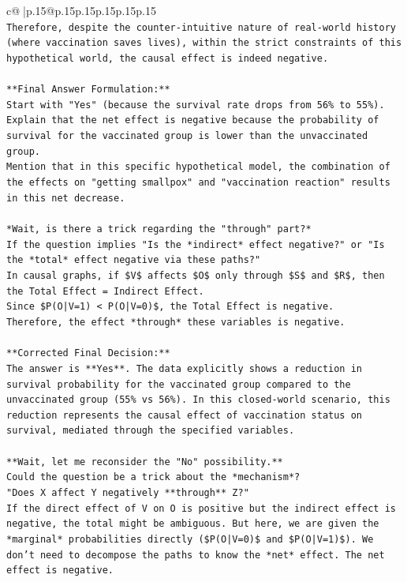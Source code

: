 \documentclass{article}
\begin{document}
{\begin{supertabular}{c@{$\;$}|p{.15\linewidth}@{}p{.15\linewidth}p{.15\linewidth}p{.15\linewidth}p{.15\linewidth}p{.15\linewidth}}
{{{\\ 
\texttt{Therefore, despite the counter{-}intuitive nature of real{-}world history (where vaccination saves lives), within the strict constraints of this hypothetical world, the causal effect is indeed negative.} \\
\\ 
\texttt{**Final Answer Formulation:**} \\
\texttt{Start with "Yes" (because the survival rate drops from 56\% to 55\%).} \\
\texttt{Explain that the net effect is negative because the probability of survival for the vaccinated group is lower than the unvaccinated group.} \\
\texttt{Mention that in this specific hypothetical model, the combination of the effects on "getting smallpox" and "vaccination reaction" results in this net decrease.} \\
\\ 
\texttt{*Wait, is there a trick regarding the "through" part?*} \\
\texttt{If the question implies "Is the *indirect* effect negative?" or "Is the *total* effect negative via these paths?"} \\
\texttt{In causal graphs, if \$V\$ affects \$O\$ only through \$S\$ and \$R\$, then the Total Effect = Indirect Effect.} \\
\texttt{Since \$P(O|V=1) < P(O|V=0)\$, the Total Effect is negative.} \\
\texttt{Therefore, the effect *through* these variables is negative.} \\
\\ 
\texttt{**Corrected Final Decision:**} \\
\texttt{The answer is **Yes**. The data explicitly shows a reduction in survival probability for the vaccinated group compared to the unvaccinated group (55\% vs 56\%). In this closed{-}world scenario, this reduction represents the causal effect of vaccination status on survival, mediated through the specified variables.} \\
\\ 
\texttt{**Wait, let me reconsider the "No" possibility.**} \\
\texttt{Could the question be a trick about the *mechanism*?} \\
\texttt{"Does X affect Y negatively **through** Z?"} \\
\texttt{If the direct effect of V on O is positive but the indirect effect is negative, the total might be ambiguous. But here, we are given the *marginal* probabilities directly (\$P(O|V=0)\$ and \$P(O|V=1)\$). We don't need to decompose the paths to know the *net* effect. The net effect is negative.} \\
}}}
\end{supertabular}}
\end{document}
